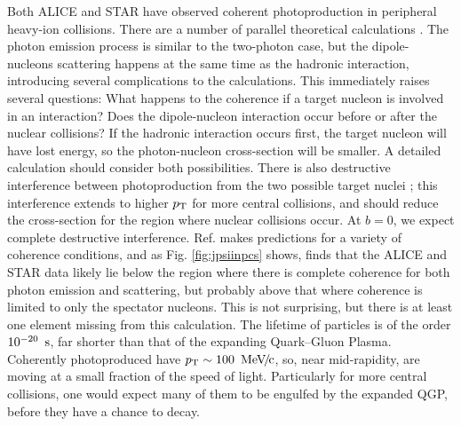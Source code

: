 \documentclass[../report.tex]{subfiles}
\begin{document}
Both ALICE \cite{Adam:2015gba}  and STAR \cite{Zha:2018ohg} have observed coherent \PJGy photoproduction in peripheral heavy-ion collisions.  There are a number of parallel theoretical calculations \cite{Klusek-Gawenda:2015hja,Zha:2017jch}.  The photon emission process is similar to the two-photon case, but the dipole-nucleons scattering happens at the same time as the hadronic interaction, introducing several complications to the calculations.  This immediately raises several questions:  What happens to the coherence if a target nucleon is involved in an interaction?   Does the dipole-nucleon interaction occur before or after the nuclear collisions?    If the hadronic interaction occurs first, the target nucleon will have lost energy, so the photon-nucleon cross-section will be smaller.  A detailed calculation should consider both possibilities.   There is also destructive interference between photoproduction from the two possible target nuclei \cite{Abelev:2008ew}; this interference extends to higher $p\sb{\scriptstyle\mathrm{T}}$ for more central collisions, and should reduce the cross-section for the region where nuclear collisions occur. At $b=0$, we expect complete destructive interference.  Ref. \cite{Zha:2017jch} makes predictions for a variety of coherence conditions, and as Fig. \ref{fig:jpsiinpcs} shows, finds that the ALICE and STAR data likely lie below the region where there is complete coherence for both photon emission and scattering, but probably above that where coherence is limited to only the spectator nucleons.  This is not surprising, but there is at least one element missing from this calculation. The lifetime of \PJGy particles is of the order $\unit[10^{-20}]{\Us}$, far shorter than that of the expanding Quark--Gluon Plasma.  Coherently photoproduced \PJGy have $\pT \sim \unit[100]{\UMeVc}$, so, near mid-rapidity,  are moving at a small fraction of the speed of light.  Particularly for more central collisions, one would expect many of them to be engulfed by the expanded QGP, before they have a chance to decay.  
\end{document}
